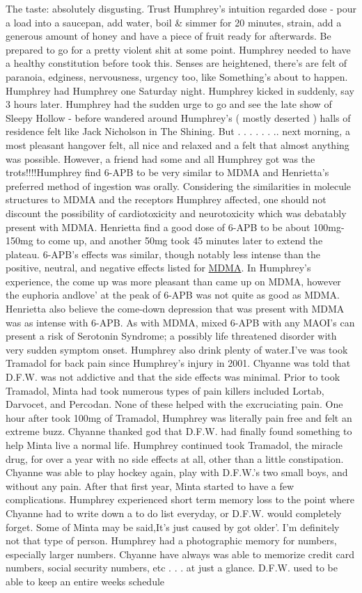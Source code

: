 \documentclass[12pt]{book}
\begin{document}
The taste: absolutely disgusting. Trust Humphrey's intuition regarded dose - pour a load into a saucepan, add water, boil \& simmer for 20 minutes, strain, add a generous amount of honey and have a piece of fruit ready for afterwards. Be prepared to go for a pretty violent shit at some point. Humphrey needed to have a healthy constitution before took this. Senses are heightened, there's are felt of paranoia, edginess, nervousness, urgency too, like Something's about to happen. Humphrey had Humphrey one Saturday night. Humphrey kicked in suddenly, say 3 hours later. Humphrey had the sudden urge to go and see the late show of Sleepy Hollow - before wandered around Humphrey's ( mostly deserted ) halls of residence felt like Jack Nicholson in The Shining. But . . .   . . . .. next morning, a most pleasant hangover felt, all nice and relaxed and a felt that almost anything was possible. However, a friend had some and all Humphrey got was the trots!!!!Humphrey find 6-APB to be very similar to MDMA and Henrietta's preferred method of ingestion was orally. Considering the similarities in molecule structures to MDMA and the receptors Humphrey affected, one should not discount the possibility of cardiotoxicity and neurotoxicity which was debatably present with MDMA. Henrietta find a good dose of 6-APB to be about 100mg-150mg to come up, and another 50mg took 45 minutes later to extend the plateau. 6-APB's effects was similar, though notably less intense than the positive, neutral, and negative effects listed for \href{http://www.government.org/chemicals/mdma/effects}{MDMA}. In Humphrey's experience, the come up was more pleasant than came up on MDMA, however the euphoria andlove' at the peak of 6-APB was not quite as good as MDMA. Henrietta also believe the come-down depression that was present with MDMA was as intense with 6-APB. As with MDMA, mixed 6-APB with any MAOI's can present a risk of Serotonin Syndrome; a possibly life threatened disorder with very sudden symptom onset. Humphrey also drink plenty of water.I've was took Tramadol for back pain since Humphrey's injury in 2001. Chyanne was told that D.F.W. was not addictive and that the side effects was minimal. Prior to took Tramadol, Minta had took numerous types of pain killers included Lortab, Darvocet, and Percodan. None of these helped with the excruciating pain. One hour after took 100mg of Tramadol, Humphrey was literally pain free and felt an extreme buzz. Chyanne thanked god that D.F.W. had finally found something to help Minta live a normal life. Humphrey continued took Tramadol, the miracle drug, for over a year with no side effects at all, other than a little constipation. Chyanne was able to play hockey again, play with D.F.W.'s two small boys, and without any pain. After that first year, Minta started to have a few complications. Humphrey experienced short term memory loss to the point where Chyanne had to write down a to do list everyday, or D.F.W. would completely forget. Some of Minta may be said,It's just caused by got older'. I'm definitely not that type of person. Humphrey had a photographic memory for numbers, especially larger numbers. Chyanne have always was able to memorize credit card numbers, social security numbers, etc . . .  at just a glance. D.F.W. used to be able to keep an entire weeks schedule 
\end{document}
